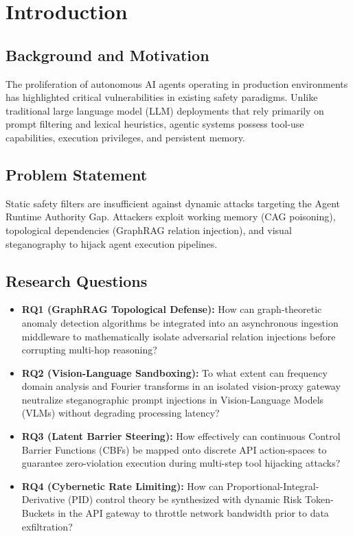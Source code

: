 \chapter{Introduction}
\label{ch:introduction}

\section{Background and Motivation}
The proliferation of autonomous AI agents operating in production environments has highlighted critical vulnerabilities in existing safety paradigms. Unlike traditional large language model (LLM) deployments that rely primarily on prompt filtering and lexical heuristics, agentic systems possess tool-use capabilities, execution privileges, and persistent memory.

\section{Problem Statement}
Static safety filters are insufficient against dynamic attacks targeting the Agent Runtime Authority Gap. Attackers exploit working memory (CAG poisoning), topological dependencies (GraphRAG relation injection), and visual steganography to hijack agent execution pipelines.

\section{Research Questions}
\begin{itemize}
    \item \textbf{RQ1 (GraphRAG Topological Defense):} How can graph-theoretic anomaly detection algorithms be integrated into an asynchronous ingestion middleware to mathematically isolate adversarial relation injections before corrupting multi-hop reasoning?
    \item \textbf{RQ2 (Vision-Language Sandboxing):} To what extent can frequency domain analysis and Fourier transforms in an isolated vision-proxy gateway neutralize steganographic prompt injections in Vision-Language Models (VLMs) without degrading processing latency?
    \item \textbf{RQ3 (Latent Barrier Steering):} How effectively can continuous Control Barrier Functions (CBFs) be mapped onto discrete API action-spaces to guarantee zero-violation execution during multi-step tool hijacking attacks?
    \item \textbf{RQ4 (Cybernetic Rate Limiting):} How can Proportional-Integral-Derivative (PID) control theory be synthesized with dynamic Risk Token-Buckets in the API gateway to throttle network bandwidth prior to data exfiltration?
\end{itemize}

